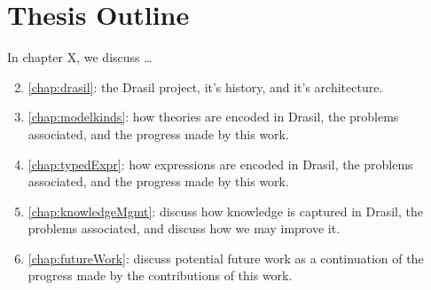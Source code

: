 \section{Thesis Outline}

In chapter X, we discuss \dots
\begin{enumerate}
    \setcounter{enumi}{1}
    \item \autoref{chap:drasil}: the Drasil project, it's history, and it's
          architecture.
    \item \autoref{chap:modelkinds}: how theories are encoded in Drasil, the
          problems associated, and the progress made by this work.
    \item \autoref{chap:typedExpr}: how expressions are encoded in Drasil, the
          problems associated, and the progress made by this work.
    \item \autoref{chap:knowledgeMgmt}: discuss how knowledge is captured in
          Drasil, the problems associated, and discuss how we may improve it.
    \item \autoref{chap:futureWork}: discuss potential future work as a
          continuation of the progress made by the contributions of this work.
\end{enumerate}
